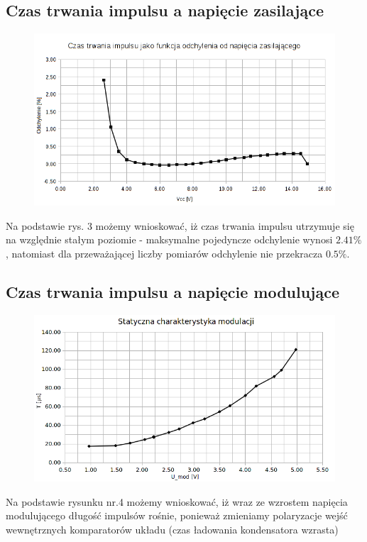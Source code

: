 \documentclass[a4paper,12pt]{article}
\begin{document}
\subsection{Czas trwania impulsu a napięcie zasilające}
\begin{figure}[h]
  \center 
  \includegraphics[width=1.1\textwidth]{charak1}
  \caption{}
\end{figure}
Na podstawie rys. 3 możemy wnioskować, iż czas trwania impulsu utrzymuje się na względnie stałym poziomie - maksymalne pojedyncze odchylenie wynosi
$2.41\%$, natomiast dla przeważającej liczby pomiarów odchylenie nie przekracza $0.5\%$.
\pagebreak
\subsection{Czas trwania impulsu a napięcie modulujące}
\begin{figure}[h]
  \centering
  \includegraphics[width=1.1\textwidth]{charak2}
  \caption{}
\end{figure}
Na podstawie rysunku nr.4 możemy wnioskować, iż wraz ze wzrostem napięcia modulującego długość impulsów rośnie, ponieważ zmieniamy polaryzacje wejść wewnętrznych komparatorów układu (czas ładowania kondensatora wzrasta)
\end{document}
